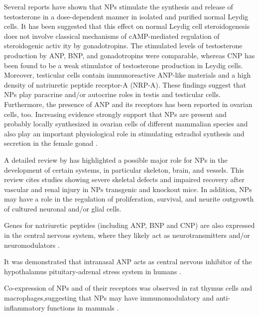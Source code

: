 \documentclass[14pt,a4paper,onecolumn]{extarticle}
\begin{document}
Several reports have shown that NPs stimulate the synthesis and release of testosterone in a dose-dependent manner in isolated and purified normal Leydig cells. It has been suggested that this effect on normal Leydig cell steroidogenesis does not involve classical mechanisms of cAMP-mediated regulation of steroidogenic activ ity by gonadotropins. The stimulated levels of testosterone production by ANP, BNP, and gonadotropins were comparable, whereas CNP has been found to be a weak stimulator of testosterone production in Leydig cells. Moreover, testicular cells contain immunoreactive ANP-like materials and a high density of natriuretic peptide receptor-A (NRP-A). These findings suggest that NPs play paracrine and/or autocrine roles in testis and testicular cells. Furthermore, the presence of ANP and its receptors has been reported in ovarian cells, too. Increasing evidence strongly support that NPs are present and probably locally synthesized in ovarian cells of different mammalian species and also play an important physiological role in stimulating estradiol synthesis and secretion in the female gonad \citep{112}. %

A detailed review by \citep{107} has highlighted a possible major role for NPs in the development of certain systems, in particular skeleton, brain, and vessels. This review cites  studies showing severe skeletal defects and impaired recovery after vascular and renal injury in NPs transgenic and knockout mice. In addition, NPs may have a role in the regulation of proliferation, survival, and neurite outgrowth of cultured neuronal and/or glial cells.


Genes for natriuretic peptides (including ANP, BNP and CNP) are also expressed in the central nervous system, where they likely act as neurotransmitters and/or neuromodulators \citep{100}.

It was demonstrated that intranasal ANP acts as central nervous inhibitor of the hypothalamus pituitary-adrenal stress system in humans \citep{103}.

Co-expression of NPs and of their receptors was observed in rat thymus cells and macrophages,suggesting that NPs may have immunomodulatory and anti-inflammatory functions in mammals \citep{106}.
\end{document}
